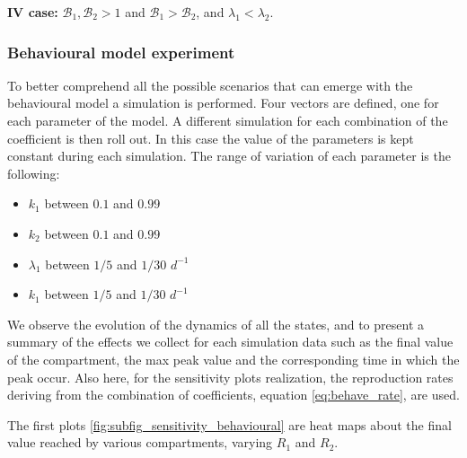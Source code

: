 \textbf{IV case: } $\mathcal{B}_1, \mathcal{B}_2 >1$ and $\mathcal{B}_1 >  \mathcal{B}_2$, and $\lambda_1 < \lambda_2$. \\



\subsubsection{Behavioural model experiment}
To better comprehend all the possible scenarios that can emerge with the behavioural model a simulation is performed. Four vectors are defined, one for each parameter of the model. A different simulation for each combination of the coefficient is then roll out. In this case the value of the parameters is kept constant during each simulation.
The range of variation of each parameter is the following:
\begin{itemize}
	\item $k_1$ between $0.1$ and $0.99$
	\item $k_2$ between $0.1$ and $0.99$
	\item $\lambda_1$ between $1/5$ and $1/30$ $d^{-1}$
	\item $k_1$ between $1/5$ and $1/30$ $d^{-1}$
\end{itemize}
We observe the evolution of the dynamics of all the states, and to present a summary of the effects we collect for each simulation data such as the final value of the compartment, the max peak value and the corresponding time in which the peak occur. 
Also here, for the sensitivity plots realization, the reproduction rates deriving from the combination of coefficients, equation \eqref{eq:behave_rate}, are used. 

The first plots \ref{fig:subfig_sensitivity_behavioural} are heat maps about the final value reached by various compartments, varying $R_1$ and $R_2$.

